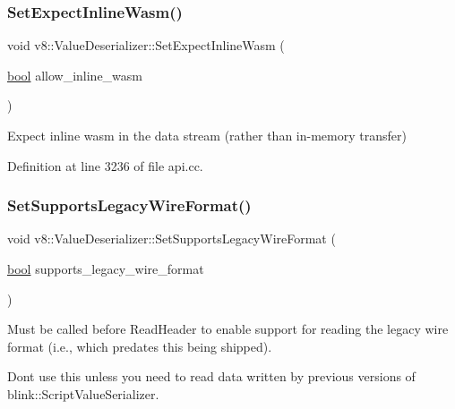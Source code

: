 \mbox{\label{classv8_1_1ValueDeserializer_a2e393ea834f217238fc144f48fd5caf1}} 
\subsubsection{\texorpdfstring{Set\+Expect\+Inline\+Wasm()}{SetExpectInlineWasm()}}
{\footnotesize\ttfamily void v8\+::\+Value\+Deserializer\+::\+Set\+Expect\+Inline\+Wasm (\begin{DoxyParamCaption}\item[{\mbox{\hyperlink{classbool}{bool}}}]{allow\+\_\+inline\+\_\+wasm }\end{DoxyParamCaption})}

Expect inline wasm in the data stream (rather than in-\/memory transfer) 

Definition at line 3236 of file api.\+cc.

\mbox{\label{classv8_1_1ValueDeserializer_a076d92b67d68c64404f1065d0dcd85b6}} 
\subsubsection{\texorpdfstring{Set\+Supports\+Legacy\+Wire\+Format()}{SetSupportsLegacyWireFormat()}}
{\footnotesize\ttfamily void v8\+::\+Value\+Deserializer\+::\+Set\+Supports\+Legacy\+Wire\+Format (\begin{DoxyParamCaption}\item[{\mbox{\hyperlink{classbool}{bool}}}]{supports\+\_\+legacy\+\_\+wire\+\_\+format }\end{DoxyParamCaption})}

Must be called before Read\+Header to enable support for reading the legacy wire format (i.\+e., which predates this being shipped).

Don\textquotesingle{}t use this unless you need to read data written by previous versions of blink\+::\+Script\+Value\+Serializer. 

